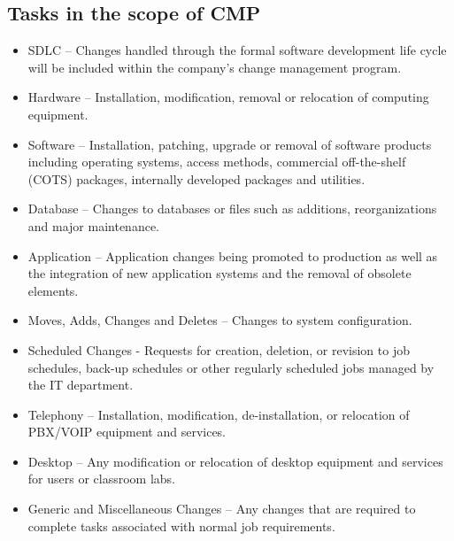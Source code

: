 \documentclass[8pt,a4]{extarticle}
\begin{document}
\begin{multicols}{3}
\subsection{Tasks in the scope of CMP}
\begin{itemize}
\item SDLC – Changes handled through the formal software development life cycle will be included within the 
company’s change management program.
\item Hardware – Installation, modification, removal or relocation of computing equipment.
\item Software – Installation, patching, upgrade or removal of software products including operating systems, access methods, commercial off-the-shelf (COTS) packages, internally developed packages and utilities.
\item Database – Changes to databases or files such as additions, reorganizations and major maintenance.
\item Application – Application changes being promoted to production as well as the integration of new application systems and the removal of obsolete elements.
\item Moves, Adds, Changes and Deletes – Changes to system configuration.
\item Scheduled Changes - Requests for creation, deletion, or revision to job schedules, back-up schedules or other regularly scheduled jobs managed by the IT department.
\item Telephony – Installation, modification, de-installation, or relocation of PBX/VOIP equipment and services.
\item Desktop – Any modification or relocation of desktop equipment and services for users or classroom labs.
\item Generic and Miscellaneous Changes – Any changes that are required to complete tasks associated with normal job requirements.
\end{itemize}


\end{multicols}
\end{document}
